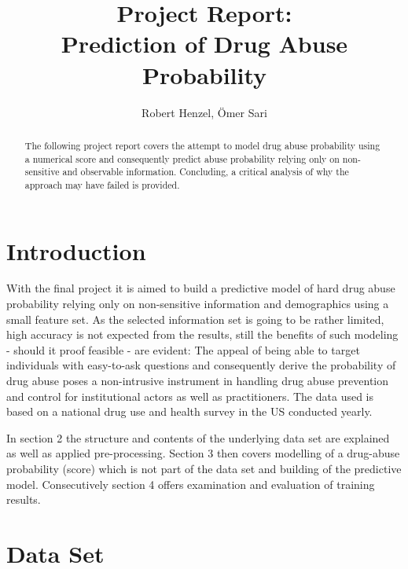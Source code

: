 \documentclass[12pt]{article}
\begin{document}
\title{\vspace{-3.0cm}Project Report: \\Prediction of Drug Abuse Probability\vspace{-0.3cm}} 
\author{Robert Henzel, Ömer Sari}
\maketitle 
\begin{abstract}
	The following project report covers the attempt to model drug abuse probability using a numerical score and consequently predict abuse probability relying only on non-sensitive and observable information. Concluding, a critical analysis of why the approach may have failed is provided.
\end{abstract}

%
%

\section{Introduction}
With the final project it is aimed to build a predictive model of hard drug abuse probability relying only on non-sensitive information and demographics  using a small feature set. As the selected information set is going to be rather limited, high accuracy is not expected from the results, still the benefits of such modeling - should it proof feasible - are evident: The appeal of being able to target individuals with easy-to-ask questions and consequently derive the probability of drug abuse poses a non-intrusive instrument in handling drug abuse prevention and control for institutional actors as well as practitioners. The data used is based on a national drug use and health survey in the US conducted yearly.

In section 2 the structure and contents of the underlying data set are explained as well as applied pre-processing. Section 3 then covers modelling of a drug-abuse probability (score) which is not part of the data set and building of the predictive model. Consecutively section 4 offers examination and evaluation of training results. 

%
%
\newpage
\section{Data Set}
\end{document}
